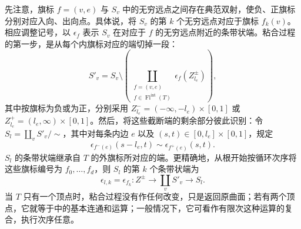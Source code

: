 先注意，旗标 $f=(v,e)$ 与 $S_v$ 中的无穷远点之间存在典范双射，使负、正旗标分别对应入向、出向点。具体说，将 $S_v$ 的第 $k$ 个无穷远点对应于旗标 $f_k(v)$。相应调整记号，以 $\epsilon_f$ 表示 $S_v$ 在对应于 $f$ 的无穷远点附近的条带状端。粘合过程的第一步，是从每个内旗标对应的端切掉一段：
\begin{equation}\label{eq:9.8}
S'_v=S_v\setminus\left(\coprod_{\substack{f=(v,e)\\f\in\operatorname{Fl}^{\mathrm{int}}(T)}}\epsilon_f(Z_{l_e}^\pm)\right),
\end{equation}
其中按旗标为负或为正，分别采用 $Z_{l_e}^-=(-\infty,-l_e)\times[0,1]$ 或 $Z_{l_e}^+=(l_e,\infty)\times[0,1]$。然后，将这些截断端的剩余部分彼此识别：令 $S_l=\coprod_vS'_v/\sim$，其中对每条内边 $e$ 以及 $(s,t)\in[0,l_e]\times[0,1]$，规定
\begin{equation}\label{eq:9.9}
\epsilon_{f^-(e)}(s-l_e,t)\sim\epsilon_{f^+(e)}(s,t).
\end{equation}
$S_l$ 的条带状端继承自 $T$ 的外旗标所对应的端。更精确地，从根开始按循环次序将这些旗标编号为 $f_0,\ldots,f_d$，则 $S_l$ 的第 $k$ 个条带状端为
\begin{equation}\label{eq:9.10}
\epsilon_{l,k}=\epsilon_{f_k}:Z^\pm\longrightarrow\coprod_vS'_v\longrightarrow S_l.
\end{equation}
当 $T$ 只有一个顶点时，粘合过程没有作任何改变，只是返回原曲面；若有两个顶点，它就等于中的基本连通和运算；一般情况下，它可看作有限次这种运算的复合，执行次序任意。

